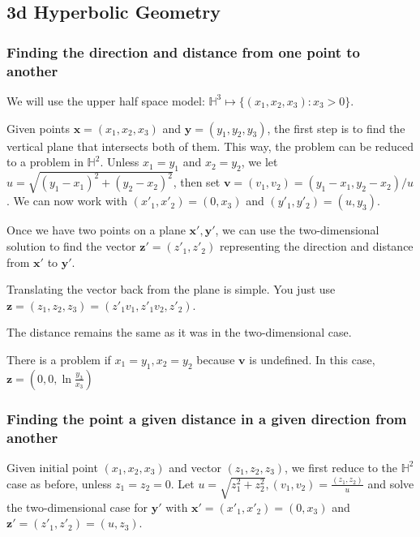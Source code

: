 \subsection{3d Hyperbolic Geometry}

\subsubsection{Finding the direction and distance from one point to another}

We will use the upper half space model: $\mathbb{H}^3 \mapsto \{(x_1,x_2,x_3):x_3 > 0\}$.

Given points $\textbf{x} = (x_1,x_2,x_3)$ and $\textbf{y} = (y_1,y_2,y_3)$, the first step is to find the vertical plane that intersects both of them. This way, the problem can be reduced to a problem in $\mathbb{H}^2$. Unless $x_1 = y_1$ and $x_2 = y_2$, we let $u = \sqrt{(y_1-x_1)^2 + (y_2-x_2)^2}$, then set $\textbf{v} = (v_1,v_2) = (y_1-x_1,y_2-x_2)/u$. We can now work with $(x'_1,x'_2) = (0,x_3)$ and $(y'_1,y'_2) = (u,y_3)$.

Once we have two points on a plane $\textbf{x}', \textbf{y}'$, we can use the two-dimensional solution to find the vector $\textbf{z}' = (z'_1,z'_2)$ representing the direction and distance from $\textbf{x}'$ to $\textbf{y}'$.

Translating the vector back from the plane is simple. You just use $\textbf{z} = (z_1,z_2,z_3) = (z'_1v_1,z'_1v_2,z'_2)$.

The distance remains the same as it was in the two-dimensional case.

There is a problem if $x_1 = y_1, x_2 = y_2$ because $\textbf{v}$ is undefined. In this case, $\textbf{z} = (0,0,\ln\frac{y_3}{x_3})$ %

\subsubsection{Finding the point a given distance in a given direction from another}

Given initial point $(x_1,x_2,x_3)$ and vector $(z_1,z_2,z_3)$, we first reduce to the $\mathbb{H}^2$ case as before, unless $z_1 = z_2 = 0$. Let $u = \sqrt{z_1^2+z_2^2}, (v_1,v_2) = \frac{(z_1,z_2)}{u}$ and solve the two-dimensional case for $\textbf{y}'$ with $\textbf{x}' = (x'_1,x'_2) = (0,x_3)$ and $\textbf{z}' = (z'_1,z'_2) = (u,z_3)$.

